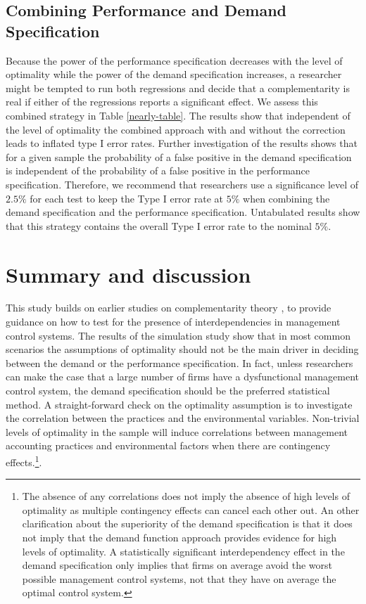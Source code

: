 \documentclass[12pt]{article}
\begin{document}
\subsection{Combining Performance and Demand Specification}

Because the power of the performance specification decreases with the level of optimality while the power of the demand specification increases, a researcher might be tempted to run both regressions and decide that a complementarity is real if either of the regressions reports a significant effect. We assess this combined strategy in Table \ref{nearly-table}. The results show that independent of the level of optimality the combined approach with and without the correction leads to inflated type I error rates. Further investigation of the results shows that for a given sample the probability of a false positive in the demand specification is independent of the probability of a false positive in the performance specification.  Therefore, we recommend that researchers use a significance level of $2.5\%$ for each test to keep the Type I error rate at $5\%$ when combining the demand specification and the performance specification. Untabulated results show that this strategy contains the overall Type I error rate to the nominal $5\%$.

\section{Summary and discussion}\label{summary-and-discussion}

This study builds on earlier studies on complementarity theory \citep{milgrom_complementarities_1995, grabner_management_2013}, to provide guidance on how to test for the presence of interdependencies in management control systems. The results of the simulation study show that in most common scenarios the assumptions of optimality should not be the main driver in deciding between the demand or the performance specification. In fact, unless researchers can make the case that a large number of firms have a dysfunctional management control system, the demand specification should be the preferred statistical method. A straight-forward check on the optimality assumption is to investigate the correlation between the practices and the environmental variables. Non-trivial levels of optimality in the sample will induce correlations between management accounting practices and environmental factors when there are contingency effects.\footnote{The absence of any correlations does not imply the absence of high levels of optimality as multiple contingency effects can cancel each other out. An other clarification about the superiority of the demand specification is that it does not imply that the demand function approach provides evidence for high levels of optimality. A statistically significant interdependency effect in the demand specification only implies that firms on average avoid the worst possible management control systems, not that they have on average the optimal control system.}.
\end{document}
